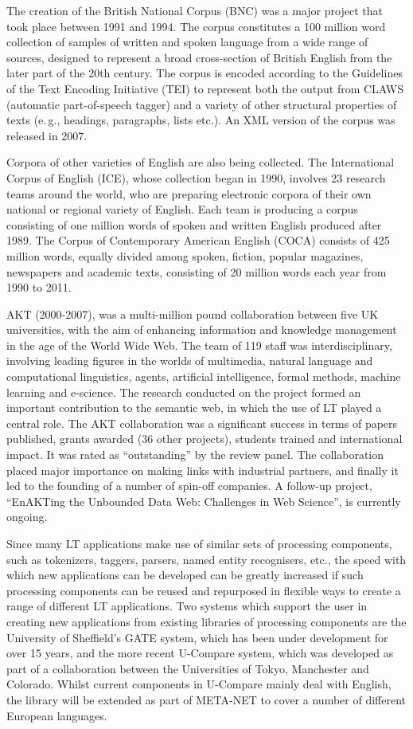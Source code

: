 \begin{multicols}{2}
The creation of the British National Corpus (BNC) was a major project that took place between 1991 and 1994. The corpus constitutes a 100 million word collection of samples of written and spoken language from a wide range of sources, designed to represent a broad cross-section of British English from the later part of the 20th century. The corpus is encoded according to the Guidelines of the Text Encoding Initiative (TEI) to represent both the output from CLAWS (automatic part-of-speech tagger) and a variety of other structural properties of texts (e.\,g., headings, paragraphs, lists etc.). An XML version of the corpus was released in 2007.

Corpora of other varieties of English are also being collected. The International Corpus of English (ICE), whose collection began in 1990, involves 23 research teams around the world, who are preparing electronic corpora of their own national or regional variety of English. Each team is producing a corpus consisting of one million words of spoken and written English produced after 1989. The Corpus of Contemporary American English (COCA) consists of 425 million words, equally divided among spoken, fiction, popular magazines, newspapers and academic texts, consisting of 20 million words each year from 1990 to 2011.

AKT (2000-2007), was a multi-million pound collaboration between five UK universities, with the aim of enhancing information and knowledge management in the age of the World Wide Web. The team of 119 staff was interdisciplinary, involving leading figures in the worlds of multimedia, natural language and computational linguistics, agents, artificial intelligence, formal methods, machine learning and e-science. The research conducted on the project formed an important contribution to the semantic web, in which the use of LT played a central role. The AKT collaboration was a significant success in terms of papers published, grants awarded (36 other projects), students trained and international impact. It was rated as ``outstanding'' by the review panel.  The collaboration placed major importance on making links with industrial partners, and finally it led to the founding of a number of spin-off companies. A follow-up project, ``EnAKTing the Unbounded Data Web: Challenges in Web Science'', is currently ongoing.

Since many LT applications make use of similar sets of processing components, such as tokenizers, taggers, parsers, named entity recognisers, etc., the speed with which new applications can be developed can be greatly increased if such processing components can be reused and repurposed in flexible ways to create a range of different LT applications. Two systems which support the user in creating new applications from existing libraries of processing components are the University of Sheffield's GATE system, which has been under development for over 15 years, and the more recent U-Compare system, which was developed as part of a collaboration between the Universities of Tokyo, Manchester and Colorado. Whilst current components in U-Compare mainly deal with English, the library will be extended as part of META-NET to cover a number of different European languages. 


\end{multicols}

